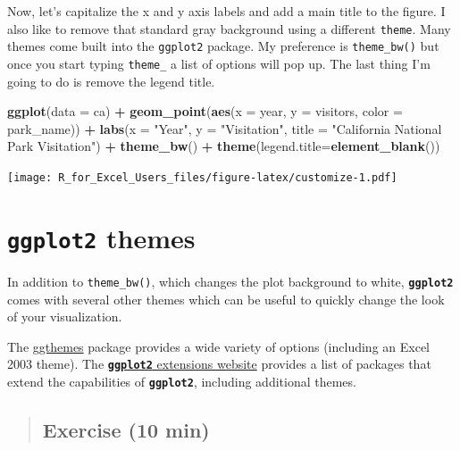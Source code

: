 \documentclass[]{book}
\newenvironment{Shaded}{\begin{snugshade}}{\end{snugshade}}
\newcommand{\DataTypeTok}[1]{\textcolor[rgb]{0.13,0.29,0.53}{#1}}
\newcommand{\KeywordTok}[1]{\textcolor[rgb]{0.13,0.29,0.53}{\textbf{#1}}}
\newcommand{\NormalTok}[1]{#1}
\newcommand{\OperatorTok}[1]{\textcolor[rgb]{0.81,0.36,0.00}{\textbf{#1}}}
\newcommand{\StringTok}[1]{\textcolor[rgb]{0.31,0.60,0.02}{#1}}
\begin{document}
Now, let's capitalize the x and y axis labels and add a main title to the figure. I also like to remove that standard gray background using a different \texttt{theme}. Many themes come built into the \texttt{ggplot2} package. My preference is \texttt{theme\_bw()} but once you start typing \texttt{theme\_} a list of options will pop up. The last thing I'm going to do is remove the legend title.

\begin{Shaded}
\begin{Highlighting}[]
\KeywordTok{ggplot}\NormalTok{(}\DataTypeTok{data =}\NormalTok{ ca) }\OperatorTok{+}
\StringTok{    }\KeywordTok{geom_point}\NormalTok{(}\KeywordTok{aes}\NormalTok{(}\DataTypeTok{x =}\NormalTok{ year, }\DataTypeTok{y =}\NormalTok{ visitors, }\DataTypeTok{color =}\NormalTok{ park_name)) }\OperatorTok{+}
\StringTok{    }\KeywordTok{labs}\NormalTok{(}\DataTypeTok{x =} \StringTok{"Year"}\NormalTok{,}
       \DataTypeTok{y =} \StringTok{"Visitation"}\NormalTok{,}
       \DataTypeTok{title =} \StringTok{"California National Park Visitation"}\NormalTok{) }\OperatorTok{+}
\StringTok{    }\KeywordTok{theme_bw}\NormalTok{() }\OperatorTok{+}
\StringTok{    }\KeywordTok{theme}\NormalTok{(}\DataTypeTok{legend.title=}\KeywordTok{element_blank}\NormalTok{())}
\end{Highlighting}
\end{Shaded}

\texttt{[image: R\_for\_Excel\_Users\_files/figure-latex/customize-1.pdf]}

\hypertarget{ggplot2-themes}{%
\section{\texorpdfstring{\textbf{\texttt{ggplot2}} themes}{ggplot2 themes}}\label{ggplot2-themes}}

In addition to \texttt{theme\_bw()}, which changes the plot background to white, \textbf{\texttt{ggplot2}} comes with several other themes which can be useful to quickly change the look of your visualization.

The \href{https://cran.r-project.org/web/packages/ggthemes/vignettes/ggthemes.html}{ggthemes} package provides a wide variety of options (including an Excel 2003 theme). The \href{https://www.ggplot2-exts.org}{\textbf{\texttt{ggplot2}} extensions website} provides a list of packages that extend the capabilities of \textbf{\texttt{ggplot2}}, including additional themes.

\begin{quote}
\hypertarget{exercise-10-min}{%
\subsection{Exercise (10 min)}\label{exercise-10-min}}
\end{quote}
\end{document}
